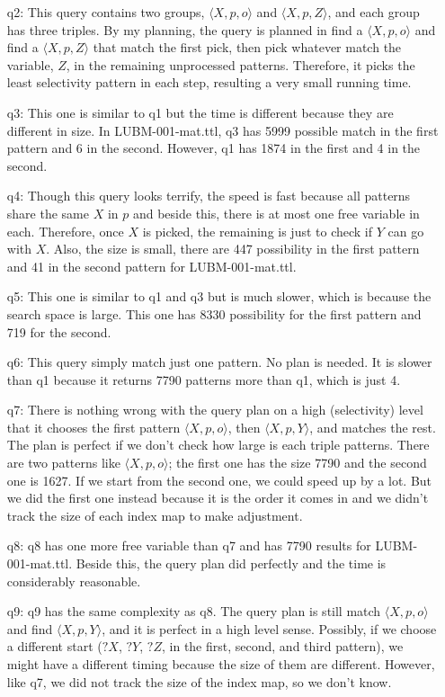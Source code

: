 \documentclass{article}
\begin{document}
\begin{enumerate}
\begin{enumerate}
\item[q2:] This query contains two groups, $\langle X, p, o\rangle$ and $\langle X, p, Z\rangle$, and each group has three triples. By my planning, the query is planned in find a $\langle X, p, o\rangle$ and find a $\langle X, p, Z\rangle$ that match the first pick, then pick whatever match the variable, $Z$, in the remaining unprocessed patterns. Therefore, it picks the least selectivity pattern in each step, resulting a very small running time. 
\item[q3:] This one is similar to q1 but the time is different because they are different in size. In LUBM-001-mat.ttl, q3 has 5999 possible match in the first pattern and 6 in the second. However, q1 has 1874 in the first and 4 in the second. 
\item[q4:] Though this query looks terrify, the speed is fast because all patterns share the same $X$ in $p$ and beside this, there is at most one free variable in each. Therefore, once $X$ is picked, the remaining is just to check if $Y$ can go with $X$. Also, the size is small, there are 447 possibility in the first pattern and  41 in the second pattern for  LUBM-001-mat.ttl. 
\item[q5:] This one is similar to q1 and q3 but is much slower, which is because the search space is large. This one has 8330 possibility for the first pattern and  719 for the second. 
\item[q6:] This query simply match just one pattern. No plan is needed. It is slower than q1 because it returns 7790 patterns more than q1, which is just 4. 
\item[q7:] There is nothing wrong with the query plan on a high (selectivity) level  that it chooses the first pattern $\langle X, p, o\rangle$, then $\langle X, p , Y\rangle$, and matches the rest. The plan is perfect if we don't check how large is each triple patterns. There are two patterns like $\langle X, p, o\rangle$; the first one has the size 7790 and the second one is 1627. If we start from the second one, we could speed up by a lot. But we did the first one instead because it is the order it comes in and we didn't track the size of each index map to make adjustment.
\item[q8:] q8 has one more free variable than q7 and has 7790 results for LUBM-001-mat.ttl. Beside this, the query plan did perfectly and the time is considerably reasonable.
\item[q9:] q9 has the same complexity as q8. The query plan is still match $\langle X, p, o\rangle$ and find $\langle X, p, Y\rangle$, and it is perfect in a high level sense. Possibly, if we choose a different start ($?X$, $?Y$, $?Z$, in the first, second, and third pattern), we might have a different timing because the size of them are different. However, like q7, we did not track the size of the index map, so we don't know. 

\end{enumerate}
\end{enumerate}
\end{document}
